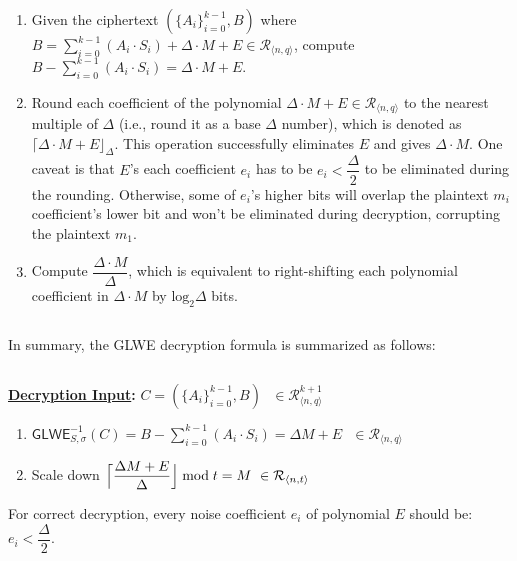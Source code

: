 \begin{enumerate}
\item Given the ciphertext $(\{A_i\}_{i=0}^{k-1}, B)$ where $B = \sum\limits_{i=0}^{k-1}{(A_i \cdot S_i)} + \Delta \cdot M + E \in \mathcal{R}_{\langle n,q \rangle}$, compute $B - \sum\limits_{i=0}^{k-1}{(A_i \cdot S_i)} = \Delta \cdot M + E$. 
\item Round each coefficient of the polynomial $\Delta \cdot M + E \in \mathcal{R}_{\langle n,q \rangle}$ to the nearest multiple of $\Delta$ (i.e., round it as a base $\Delta$ number), which is denoted as $\lceil \Delta \cdot M + E \rfloor_{\Delta}$. This operation successfully eliminates $E$ and gives $\Delta \cdot M$. One caveat is that $E$'s each coefficient $e_i$ has to be $e_i < \dfrac{\Delta}{2}$ to be eliminated during the rounding. Otherwise, some of $e_i$'s higher bits will overlap the plaintext $m_i$ coefficient's lower bit and won't be eliminated during decryption, corrupting the plaintext $m_1$.
\item Compute $\dfrac{\Delta \cdot M} {\Delta}$, which is equivalent to right-shifting each polynomial coefficient in $\Delta \cdot M$ by $\text{log}_2 \Delta$ bits. 
\end{enumerate}

$ $

In summary, the GLWE decryption formula is summarized as follows:

$ $

\begin{tcolorbox}[title={\textbf{\tboxlabel{\ref*{subsec:glwe-dec}} GLWE Decryption}}]
\textbf{\underline{Decryption Input}:} $C = (\{A_i\}_{i=0}^{k-1}, B) \text{ } \in \mathcal{R}_{\langle n,q \rangle}^{k + 1}$

\begin{enumerate}
\item $\textsf{GLWE}^{-1}_{S,\sigma}(C) = B - \sum\limits_{i=0}^{k-1}{(A_i \cdot S_i)} = \Delta  M + E \text{ } \in \mathcal{R}_{\langle n,q \rangle}$

\item Scale down 
$\Bigl\lceil \dfrac{ \Delta  M + E }{\Delta}\Bigr\rfloor \bmod t = M \text{ } \in \mathcal{R}_{\langle n, t \rangle}$

\end{enumerate}

For correct decryption, every noise coefficient $e_i$ of polynomial $E$ should be: $e_i < \dfrac{\Delta}{2}$.

\end{tcolorbox}


